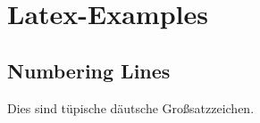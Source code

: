 \documentclass[12pt]{book}
\begin{document}
	\part{Latex-Examples}
	\chapter{Numbering Lines}
	\begin{Huge}
	Dies sind tüpische däutsche Großsatzzeichen.	
	\end{Huge} 
	
	\begin{itshape}
		\blindtext
	\end{itshape}

    \blindtext
    
\end{document}

